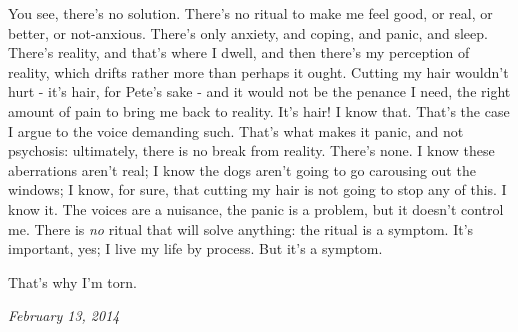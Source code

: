 \begin{leftcolumn}
You see, there's no solution. There's no ritual to make me feel good, or real, or better, or not-anxious. There's only anxiety, and coping, and panic, and sleep. There's reality, and that's where I dwell, and then there's my perception of reality, which drifts rather more than perhaps it ought. Cutting my hair wouldn't hurt - it's hair, for Pete's sake - and it would not be the penance I need, the right amount of pain to bring me back to reality. It's hair! I know that. That's the case I argue to the voice demanding such. That's what makes it panic, and not psychosis: ultimately, there is no break from reality. There's none. I know these aberrations aren't real; I know the dogs aren't going to go carousing out the windows; I know, for sure, that cutting my hair is not going to stop any of this. I know it. The voices are a nuisance, the panic is a problem, but it doesn't control me. There is \emph{no} ritual that will solve anything: the ritual is a symptom. It's important, yes; I live my life by process. But it's a symptom.

That's why I'm torn.
\newpage

\end{leftcolumn}
\begin{rightcolumn*}
\emph{February 13, 2014}
\end{rightcolumn*}
